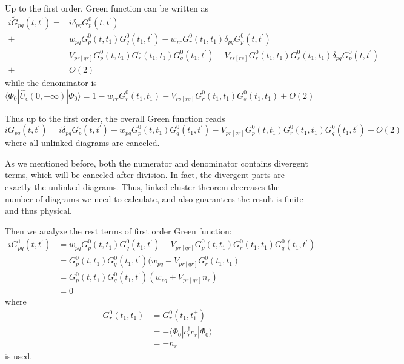 Up to the first order, Green function can be written as
\begin{equation}
	\begin{aligned}
		i\tilde{G}_{pq}(t,t^{\prime})=&i \delta_{pq} G^0_{p}(t,t^{\prime})
		\\
		+&w_{pq} G^0_p(t,t_1) G^0_q(t_1,t^{\prime}) - w_{rr} G^0_r(t_1,t_1) \delta_{pq} G^0_{p}(t,t^{\prime})
		\\
		-&V_{pr[qr]} G^0_{p}(t,t_1) G^0_{r}(t_1,t_1) G^0_{q}(t_1,t^{\prime})
		- V_{rs[rs]} G^0_r(t_1,t_1) G^0_s(t_1,t_1) \delta_{pq} G^0_p(t,t^{\prime})
		\\
		+&O(2)
	\end{aligned}
\end{equation}
while the denominator is 
\begin{equation}
	\langle\Phi_{0}|\hat{U}_{\epsilon}(0,-\infty)| \Phi_{0}\rangle=1
		- w_{rr} G^0_r(t_1,t_1)
		- V_{rs[rs]} G^0_r(t_1,t_1) G^0_s(t_1,t_1)
		+ O(2)
\end{equation}

Thus up to the first order,  the overall Green function reads
\begin{equation}
	i G_{pq}(t,t^{\prime})=i \delta_{pq} G^0_{p}(t,t^{\prime})
	+w_{pq} G^0_p(t,t_1) G^0_q(t_1,t^{\prime})
	-V_{pr[qr]} G^0_{p}(t,t_1) G^0_{r}(t_1,t_1) G^0_{q}(t_1,t^{\prime}) +O(2)
\end{equation}
where all unlinked diagrams are canceled.

As we mentioned before, both the numerator and denominator contains divergent terms, which will be canceled after division.
In fact, the divergent parts are exactly the unlinked diagrams.
Thus, linked-cluster theorem decreases the number of diagrams we need to calculate, and also guarantees the result is finite and thus physical.

Then we analyze the rest terms of first order Green function:
\begin{equation}
	\begin{aligned}
		i G^1_{pq}(t,t^{\prime}) &= w_{pq} G^0_p(t,t_1) G^0_q(t_1,t^{\prime})
		-V_{pr[qr]} G^0_{p}(t,t_1) G^0_{r}(t_1,t_1) G^0_{q}(t_1,t^{\prime})
		\\
		&= G^0_p(t,t_1) G^0_q(t_1,t^{\prime}) (w_{pq}-V_{pr[qr]}G^0_r(t_1,t_1)
		\\
		&= G^0_p(t,t_1) G^0_q(t_1,t^{\prime}) (w_{pq}+V_{pr[qr]}n_r)
		\\
		&=0
	\end{aligned}
\end{equation}
where 
\begin{equation}
	\begin{aligned}
		G^0_r(t_1,t_1)&=G^0_r(t_1,t_1^{+})
		\\
		&=- \langle\Phi_{0}|
		c_r^{\dagger} c_r
		| \Phi_{0}\rangle
		\\
		&=-n_r
	\end{aligned}
\end{equation}
is used.

